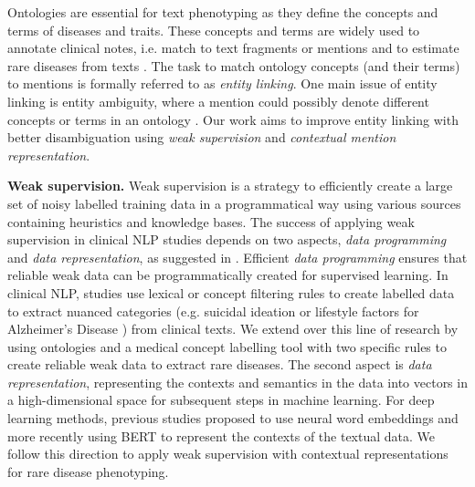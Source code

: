 \documentclass[twocolumn]{bmcart}
\begin{document}
Ontologies are essential for text phenotyping as they define the concepts and terms of diseases and traits. These concepts and terms are widely used to annotate clinical notes, i.e. match to text fragments or mentions \cite{kersloot_natural_2020} and to estimate rare diseases from texts \cite{kahn2017ontology}. The task to match ontology concepts (and their terms) to mentions is formally referred to as \textit{entity linking}. One main issue of entity linking is entity ambiguity, where a mention could possibly denote different concepts or terms in an ontology \cite{shen2015}. Our work aims to improve entity linking with better disambiguation using \emph{weak supervision} and \emph{contextual mention representation}.

\textbf{Weak supervision.} Weak supervision \cite{wang_clinical_2019,ratner2019} is a strategy to efficiently create a large set of noisy labelled training data in a programmatical way using various sources containing heuristics and knowledge bases. The success of applying weak supervision in clinical NLP studies depends on two aspects, \emph{data programming} and \emph{data representation}, as suggested in \cite{wang_clinical_2019}. Efficient \emph{data programming} ensures that reliable weak data can be programmatically created for supervised learning. In clinical NLP, studies use lexical or concept filtering rules to create labelled data to extract nuanced categories (e.g. suicidal ideation \cite{cusick2021} or lifestyle factors for Alzheimer's Disease \cite{shen2022classifying}) from clinical texts. We extend over this line of research by using ontologies and a medical concept labelling tool with two specific rules to create reliable weak data to extract rare diseases. The second aspect is \emph{data representation}, representing the contexts and semantics in the data into vectors in a high-dimensional space for subsequent steps in machine learning. For deep learning methods, previous studies \cite{wang_clinical_2019,shen2022classifying} proposed to use neural word embeddings and more recently using BERT \cite{devlin-etal-2019-bert} to represent the contexts of the textual data. We follow this direction to apply weak supervision with contextual representations for rare disease phenotyping.
\end{document}
